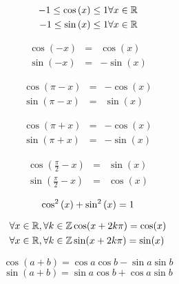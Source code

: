
\begin{multicols}{2}

\begin{eqnarray}
-1 \leq \cos{(x)} \leq 1 & \forall x \in \mathbb{R} \\  
-1 \leq \sin{(x)} \leq 1 & \forall x \in \mathbb{R} 
\end{eqnarray}


\begin{eqnarray}
\cos(-x) & = & \cos{(x)}\\
\sin(-x) & = & -\sin{(x)}
\end{eqnarray}

\begin{eqnarray}
\cos(\pi - x) & = & -\cos(x)\\
\sin(\pi - x) & = &\sin(x)
\end{eqnarray}

\begin{eqnarray}
\cos(\pi + x) & = & -\cos(x)\\
\sin(\pi + x) & = & -\sin(x)
\end{eqnarray}

\begin{eqnarray}
\cos(\frac{\pi}{2} - x) & = & \sin(x)\\
\sin(\frac{\pi}{2} - x) & = &\cos(x)
\end{eqnarray}

\begin{equation}
\cos^2{(x)}+\sin^2{(x)} = 1\\
\end{equation}

\end{multicols}


\begin{eqnarray}{ }
\forall x \in \mathbb{R}, \forall k \in \mathbb{Z} & \cos (x + 2k \pi)  =  \cos(x) \\ 
\forall x \in \mathbb{R}, \forall k \in \mathbb{Z} & \sin (x + 2k \pi)  =  \sin(x)  
\end{eqnarray}

\begin{multicols}{2}

\begin{equation}
\cos(a+b) = \cos{a}\cos{b} - \sin{a}\sin{b}
\label{cosaplusb}
\end{equation}
%
%
\begin{equation}
\sin(a+b) = \sin{a}\cos{b} + \cos{a}\sin{b}
\label{sinaplusb}
\end{equation}

\end{multicols}




